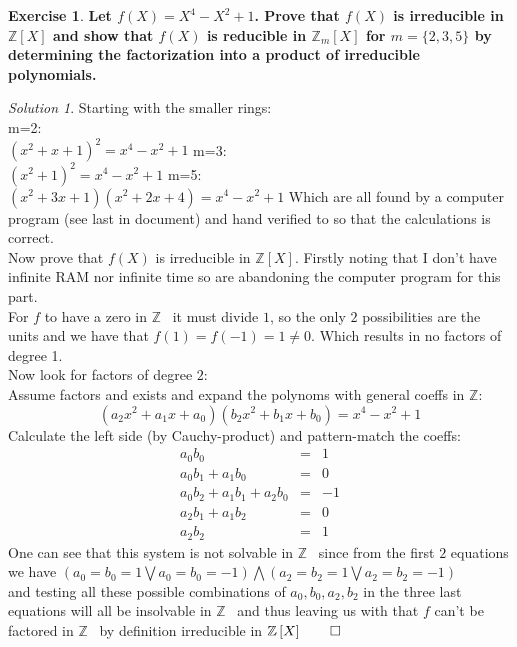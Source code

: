 \documentclass[a4paper,twoside=false,abstract=false,numbers=noenddot,
titlepage=false,headings=small,parskip=half,version=last]{scrartcl}
\theoremstyle{definition}
\newtheorem{exercise}{Exercise}
\theoremstyle{remark}
\newtheorem*{solution}{Solution}
\newcommand{\ZZ}{\ensuremath{\mathbb{Z}}}
\begin{document}
\begin{exercise}
{\bf
Let $f(X)=X^4-X^2+1$. Prove that $f(X)$ is irreducible in $\ZZ\left[X\right]$
and show that $f(X)$ is reducible in $\ZZ_m\left[X\right]$ for
$m=\{2,3,5\}$ by determining the factorization into a product of
irreducible polynomials.
}
\end{exercise}
\begin{solution}
Starting with the smaller rings:\\
m=2:\\
$(x^2+x+1)^2=x^4-x^2+1$
m=3:\\
$(x^2+1)^2=x^4-x^2+1$
m=5:\\
$(x^2+3x+1)(x^2+2x+4)=x^4-x^2+1$
Which are all found by a computer program (see last in document) and hand verified to so that the
calculations is correct.\\

Now prove that $f(X)$ is irreducible in $\ZZ\left[X\right]$. Firstly noting
that I don't have infinite RAM nor infinite time so are abandoning the
computer program for this part.\\
For $f$ to have a
zero in \ZZ ~ it must divide $1$, so the only $2$ possibilities are the units and we
have that $f(1)=f(-1)=1\neq0$. Which results in no factors of degree 1.\\
Now look for factors of degree $2$:\\
Assume factors and exists and expand the polynoms with general coeffs in \ZZ:\\
\begin{equation}
    (a_2x^2+a_1x+a_0)(b_2x^2+b_1x+b_0)=x^4-x^2+1
\end{equation}
Calculate the left side (by Cauchy-product) and pattern-match the coeffs:\\
\begin{eqnarray}
    a_0b_0&=&1 \\
    a_0b_1+a_1b_0&=&0\\
    a_0b_2+a_1b_1+a_2b_0&=&-1\\
    a_2b_1+a_1b_2&=&0\\ 
    a_2b_2&=&1
\end{eqnarray}
One can see that this system is not solvable in \ZZ~ since from the first $2$
equations we have $(a_0=b_0=1 \bigvee a_0=b_0=-1)\bigwedge(a_2=b_2=1\bigvee
a_2=b_2=-1)$\\ and testing all these possible combinations of $a_0,b_0,a_2,b_2$
in the three last equations will all be insolvable in \ZZ~ and thus leaving us
with that $f$ can't be factored in \ZZ~ by definition irreducible in
$\ZZ\left[X\right] \qed$

\end{solution}
\end{document}
